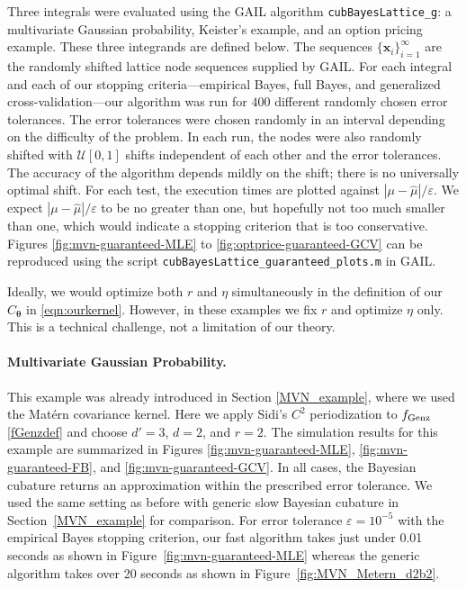 \documentclass{svjour3}                     %
\newcommand{\bm}[1]{\boldsymbol{#1}}
\newcommand{\vtheta}{{\bm{\theta}}}
\newcommand{\vx}{\bm{x}}
\newcommand{\hmu}{\widehat{\mu}}
\newcommand{\code}[1]{\texttt{#1}}
\def\abs#1{\ensuremath{\left \lvert #1 \right \rvert}}
\newcommand\figref{Figure~\ref}
\newcommand\secref{Section~\ref}
\begin{document}
Three integrals were evaluated using the GAIL algorithm \code{cubBayesLattice\_g}:  a multivariate Gaussian  probability, Keister's example, and an option pricing example. 
These three integrands are defined below.
The sequences $\{\vx_i\}_{i=1}^\infty$ are the randomly shifted lattice node sequences supplied by GAIL. 
For each integral and each of our stopping criteria---empirical Bayes, full Bayes, and generalized cross-validation---our algorithm was run for $400$ different randomly chosen error tolerances. The error tolerances were chosen randomly in an interval depending on the difficulty of the problem. In each run, the nodes were also randomly shifted with $\mathcal{U}[0,1]$ shifts independent of each other and the error tolerances. The accuracy of the algorithm depends mildly on the shift; there is no universally optimal shift.
For each test, the execution times are plotted against $\abs{\mu - \hmu}/\varepsilon$.  We expect $\abs{\mu - \hmu}/\varepsilon$ to be no greater than one, but hopefully not too much smaller than one, which would indicate a stopping criterion that is too conservative. Figures \ref{fig:mvn-guaranteed-MLE} to \ref{fig:optprice-guaranteed-GCV} can be reproduced using the script \code{cubBayesLattice\_guaranteed\_plots.m} in GAIL.

Ideally, we would optimize both $r$ and $\eta$ simultaneously in the definition of our $C_\vtheta$ in \eqref{eqn:ourkernel}.  However, in these examples we fix $r$ and optimize $\eta$ only.  This is a technical challenge, not a limitation of our theory.




\paragraph{Multivariate Gaussian Probability.}

This example was already introduced in Section \ref{MVN_example}, where we used the Mat\'ern covariance kernel.  Here we apply Sidi's $C^2$  periodization to $ f_{\textup{Genz}}$ \eqref{fGenzdef} and choose $d'=3$, $d=2$, and $r=2$. The simulation results for this example are summarized in Figures \ref{fig:mvn-guaranteed-MLE}, \ref{fig:mvn-guaranteed-FB}, and \ref{fig:mvn-guaranteed-GCV}.  In all cases, the Bayesian cubature returns an approximation within the prescribed error tolerance. We used the same setting as before with generic slow Bayesian cubature in \secref{MVN_example} for comparison. For error tolerance $\varepsilon=10^{-5}$ with the empirical Bayes stopping criterion, our fast algorithm takes just under 0.01 seconds as shown in \figref{fig:mvn-guaranteed-MLE} whereas the generic algorithm takes over 20 seconds as shown in \figref{fig:MVN_Metern_d2b2}. 
\end{document}
